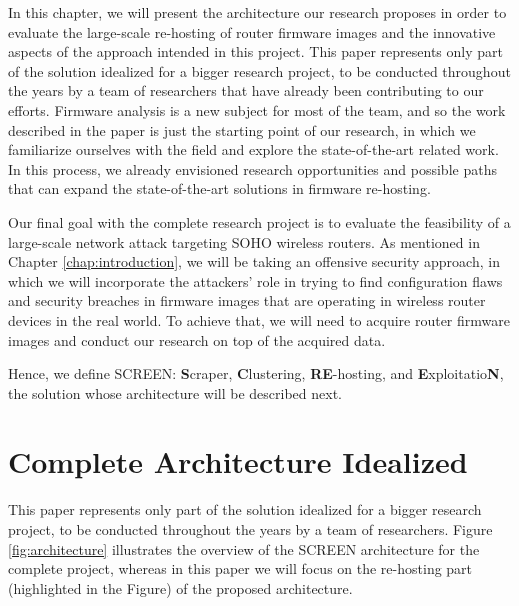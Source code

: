 
In this chapter, we will present the architecture our research proposes in order to evaluate the large-scale re-hosting of router firmware images and the innovative aspects of the approach intended in this project. This paper represents only part of the solution idealized for a bigger research project, to be conducted throughout the years by a team of researchers that have already been contributing to our efforts. Firmware analysis is a new subject for most of the team, and so the work described in the paper is just the starting point of our research, in which we familiarize ourselves with the field and explore the state-of-the-art related work. In this process, we already envisioned research opportunities and possible paths that can expand the state-of-the-art solutions in firmware re-hosting.

Our final goal with the complete research project is to evaluate the feasibility of a large-scale network attack targeting SOHO wireless routers. As mentioned in Chapter \ref{chap:introduction}, we will be taking an offensive security approach, in which we will incorporate the attackers' role in trying to find configuration flaws and security breaches in firmware images that are operating in wireless router devices in the real world. To achieve that, we will need to acquire router firmware images and conduct our research on top of the acquired data. 

Hence, we define SCREEN: {\bf S}craper, {\bf C}lustering, {\bf RE}-hosting, and {\bf E}xploitatio{\bf N}, the solution whose architecture will be described next.

\section{Complete Architecture Idealized}

This paper represents only part of the solution idealized for a bigger research project, to be conducted throughout the years by a team of researchers. Figure \ref{fig:architecture} illustrates the overview of the SCREEN architecture for the complete project, whereas in this paper we will focus on the re-hosting part (highlighted in the Figure) of the proposed architecture. 


